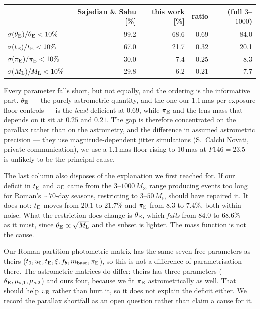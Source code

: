 \documentclass[english,10pt,a4paper]{article}
\newcommand{\tE}{t_{\rm E}}
\newcommand{\piE}{\pi_{\rm E}}
\newcommand{\tetE}{\theta_{\rm E}}
\newcommand{\Ml}{M_{\rm L}}
\newcommand{\Msun}{M_\odot}
\begin{document}
\begin{center}
\begin{tabular}{lrrrr}
\toprule
 & Sajadian \& Sahu [\%] & this work [\%] & ratio & (full $3$--$1000$) \\
\midrule
$\sigma(\tetE)/\tetE < 10\%$ & 99.2 & 68.6 & 0.69 & 84.0 \\
$\sigma(\tE)/\tE < 10\%$     & 67.0 & 21.7 & 0.32 & 20.1 \\
$\sigma(\piE)/\piE < 10\%$   & 30.0 &  7.4 & 0.25 &  8.3 \\
$\sigma(\Ml)/\Ml < 10\%$     & 29.8 &  6.2 & 0.21 &  7.7 \\
\bottomrule
\end{tabular}
\end{center}

Every parameter falls short, but not equally, and the ordering is the informative part.
$\tetE$ --- the purely astrometric quantity, and the one our $1.1$\,mas per-exposure floor
controls --- is the \emph{least} deficient at $0.69$, while $\piE$ and the lens mass that depends
on it sit at $0.25$ and $0.21$. The gap is therefore concentrated on the parallax rather than on
the astrometry, and the difference in assumed astrometric precision --- they use
magnitude-dependent jitter simulations (S.\ Calchi Novati, private communication), we use a
$1.1$\,mas floor rising to $10$\,mas at $F146 = 23.5$ --- is unlikely to be the principal cause.

The last column also disposes of the explanation we first reached for. If our deficit in $\tE$ and
$\piE$ came from the $3$--$1000\,\Msun$ range producing events too long for Roman's $\sim\!70$-day
seasons, restricting to $3$--$50\,\Msun$ should have repaired it. It does not: $\tE$ moves from
$20.1$ to $21.7\%$ and $\piE$ from $8.3$ to $7.4\%$, both within noise. What the restriction does
change is $\tetE$, which \emph{falls} from $84.0$ to $68.6\%$ --- as it must, since
$\tetE \propto \sqrt{\Ml}$ and the subset is lighter. The mass function is not the cause.

Our Roman-partition photometric matrix has the same seven free parameters as theirs
($t_0,u_0,\tE,\xi,f_b,m_{\rm base},\piE$), so this is not a difference of parametrisation there.
The astrometric matrices do differ: theirs has three parameters ($\tetE,\mu_{s,1},\mu_{s,2}$) and
ours four, because we fit $\piE$ astrometrically as well. That should help $\piE$ rather than hurt
it, so it does not explain the deficit either. We record the parallax shortfall as an open
question rather than claim a cause for it.
\end{document}
